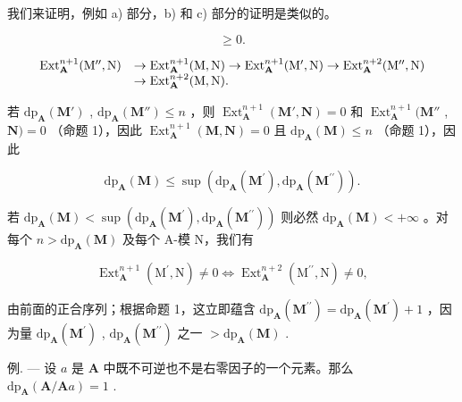 我们来证明，例如 a) 部分，b) 和 c) 部分的证明是类似的。

\[
\geqslant 0.
\]

\[
\begin{array}{r l}\operatorname{Ext} _ {\mathbf {A}} ^ {n + 1} (\mathrm{M} ^ {\prime \prime}, \mathrm{N})&\rightarrow \operatorname{Ext} _ {\mathbf {A}} ^ {n + 1} (\mathrm{M}, \mathrm{N}) \rightarrow \operatorname{Ext} _ {\mathbf {A}} ^ {n + 1} (\mathrm{M} ^ {\prime}, \mathrm{N}) \rightarrow \operatorname{Ext} _ {\mathbf {A}} ^ {n + 2} (\mathrm{M} ^ {\prime \prime}, \mathrm{N})\\&\rightarrow \operatorname{Ext} _ {\mathbf {A}} ^ {n + 2} (\mathrm{M}, \mathrm{N}).\end{array}
\]

若 \(\mathrm{dp}_{\mathbf{A}}(\mathbf{M}')\) , \(\mathrm{dp}_{\mathbf{A}}(\mathbf{M}'')\leqslant n\) ，则 \(\operatorname{Ext}_{\mathbf{A}}^{n+1}(\mathbf{M}',\mathbf{N})=0\) 和 \(\operatorname{Ext}_{\mathbf{A}}^{n+1}(\mathbf{M}''\) , \(\mathbf{N})=0\) （命题 1），因此 \(\operatorname{Ext}_{\mathbf{A}}^{n+1}(\mathbf{M},\mathbf{N})=0\) 且 \(\mathrm{dp}_{\mathbf{A}}(\mathbf{M})\leqslant n\) （命题 1），因此

\[
\mathrm{dp} _ {\mathbf {A}} (\mathbf {M}) \leqslant \sup \left(\mathrm{dp} _ {\mathbf {A}} (\mathbf {M} ^ {\prime}), \mathrm{dp} _ {\mathbf {A}} (\mathbf {M} ^ {\prime \prime})\right).
\]

若 \(\mathrm{dp}_{\mathbf{A}}(\mathbf{M}) < \sup (\mathrm{dp}_{\mathbf{A}}(\mathbf{M}^{\prime}),\mathrm{dp}_{\mathbf{A}}(\mathbf{M}^{\prime \prime}))\) 则必然 \(\mathrm{dp}_{\mathbf{A}}(\mathbf{M}) < + \infty\) 。对每个 \(n > \mathrm{dp}_{\mathbf{A}}(\mathbf{M})\) 及每个 A-模 N，我们有

\[
\operatorname{Ext} _ {\mathbf {A}} ^ {n + 1} \left(\mathrm{M} ^ {\prime}, \mathrm{N}\right) \neq 0 \Leftrightarrow \operatorname{Ext} _ {\mathbf {A}} ^ {n + 2} \left(\mathrm{M} ^ {\prime \prime}, \mathrm{N}\right) \neq 0,
\]

由前面的正合序列；根据命题 1，这立即蕴含 \(\mathrm{dp}_{\mathbf{A}}(\mathbf{M}^{\prime \prime}) = \mathrm{dp}_{\mathbf{A}}(\mathbf{M}^{\prime}) + 1\) ，因为量 \(\mathrm{dp}_{\mathbf{A}}(\mathbf{M}^{\prime})\) , \(\mathrm{dp}_{\mathbf{A}}(\mathbf{M}^{\prime \prime})\) 之一 \(> \mathrm{dp}_{\mathbf{A}}(\mathbf{M})\) .

例. --- 设 \(a\) 是 \(\mathbf{A}\) 中既不可逆也不是右零因子的一个元素。那么 \(\mathrm{dp}_{\mathbf{A}}(\mathbf{A}/\mathbf{A}a)=1\) .

